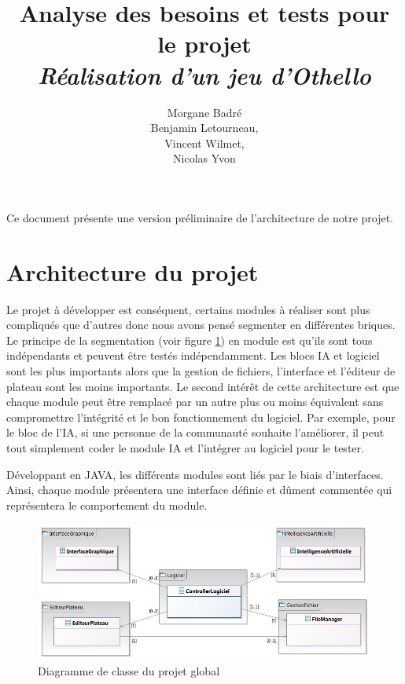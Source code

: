 \documentclass[a4paper,12pt]{article}
\begin{document}
\title{Analyse des besoins et tests pour le projet\\
  \textit{Réalisation d'un jeu d'Othello}}

\author{Morgane Badré\\
  Benjamin Letourneau,\\
  Vincent Wilmet,\\
  Nicolas Yvon\\}
\date{}

\maketitle

Ce document présente une version préliminaire de l'architecture de notre projet.

\section{Architecture du projet}
Le projet à développer est conséquent, certains modules à réaliser sont plus compliqués que d’autres donc nous avons pensé segmenter en différentes briques. Le principe de la segmentation (voir figure \ref{glob}) en module est qu’ils sont tous indépendants et peuvent être testés indépendamment. Les blocs IA et logiciel sont les plus importants alors que la gestion de fichiers, l’interface et l'éditeur de plateau sont les moins importants. Le second intérêt de cette architecture est que chaque module peut être remplacé par un autre plus ou moins équivalent sans compromettre l’intégrité et le bon fonctionnement du logiciel. Par exemple, pour le bloc de l’IA, si une personne de la communauté souhaite l’améliorer, il peut tout simplement coder le module IA et l’intégrer au logiciel pour le tester. 

Développant en JAVA, les différents modules sont liés par le biais d’interfaces. Ainsi, chaque module présentera une interface définie et dûment commentée qui représentera le comportement du module.


\begin{figure}[H]
\includegraphics[scale=0.65]{ArchiProjet.jpg}
\caption{Diagramme de classe du projet global}
\label{glob}
\end{figure}
\end{document}
